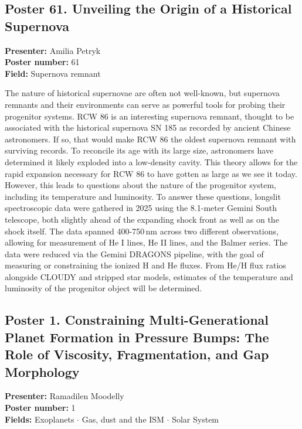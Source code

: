 \hypertarget{poster-abstract-talk-257}{}\label{poster-abstract-page-talk-257}
\subsection*{Poster 61. Unveiling the Origin of a Historical Supernova}
\textbf{Presenter:} Amilia Petryk\\
\textbf{Poster number:} 61\\
\textbf{Field:} Supernova remnant

The nature of historical supernovae are often not well-known, but supernova remnants and their environments can serve as powerful tools for probing their progenitor systems. RCW 86 is an interesting supernova remnant, thought to be associated with the historical supernova SN 185 as recorded by ancient Chinese astronomers. If so, that would make RCW 86 the oldest supernova remnant with surviving records. To reconcile its age with its large size, astronomers have determined it likely exploded into a low-density cavity. This theory allows for the rapid expansion necessary for RCW 86 to have gotten as large as we see it today. However, this leads to questions about the nature of the progenitor system, including its temperature and luminosity. To answer these questions, longslit spectroscopic data were gathered in 2025 using the 8.1-meter Gemini South telescope, both slightly ahead of the expanding shock front as well as on the shock itself. The data spanned 400-750\,nm across two different observations, allowing for measurement of He I lines, He II lines, and the Balmer series. The data were reduced via the Gemini DRAGONS pipeline, with the goal of measuring or constraining the ionized H and He fluxes. From He/H flux ratios alongside CLOUDY and stripped star models, estimates of the temperature and luminosity of the progenitor object will be determined.


\hypertarget{poster-abstract-talk-80}{}\label{poster-abstract-page-talk-80}
\subsection*{Poster 1. Constraining Multi-Generational Planet Formation in Pressure Bumps: The Role of Viscosity, Fragmentation, and Gap Morphology}
\textbf{Presenter:} Ramadilen Moodelly\\
\textbf{Poster number:} 1\\
\textbf{Fields:} Exoplanets $\cdot$ Gas, dust and the ISM $\cdot$ Solar System

